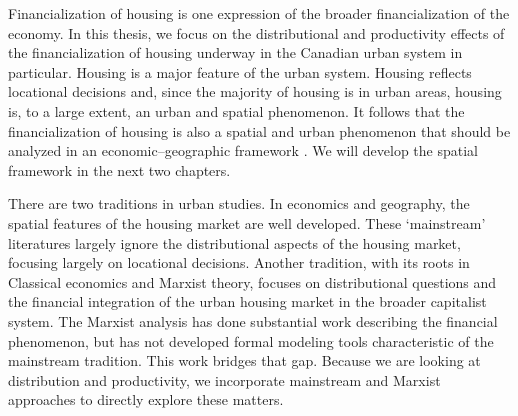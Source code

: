Financialization of housing %
is one expression of the broader financialization of the economy. In this thesis, we focus on the distributional and productivity effects of the financialization of housing underway in the Canadian urban system in particular. Housing is a major feature of the urban system.  Housing reflects locational decisions and, since the majority of housing is in urban areas, housing is, to a large extent, an urban and spatial phenomenon. It follows that the financialization of housing is also a spatial and urban phenomenon that should be analyzed in an economic–geographic framework \cite{aalbersPotentialFinancialization2015}. We will develop the spatial framework in the next two chapters. 

There are two traditions in urban studies. In economics and geography, the spatial features of the housing market are well developed. These `mainstream' literatures largely ignore the distributional aspects of the housing market, focusing largely on locational decisions. Another tradition, with its roots in Classical economics and Marxist theory, focuses on distributional questions and the financial integration of the urban housing market in the broader capitalist system.  The Marxist analysis has done substantial work describing the financial phenomenon, but has not developed formal modeling tools characteristic of the mainstream tradition.   This work bridges that gap. Because we are looking at distribution and productivity, we incorporate mainstream and Marxist approaches to directly explore these matters.


